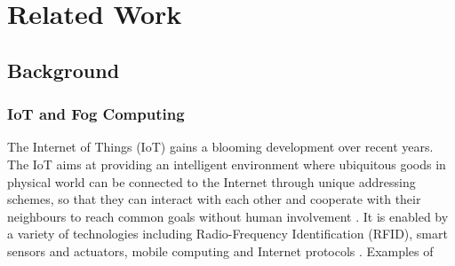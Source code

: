 \chapter{Related Work}\label{ch3}


\section{Background} \label{background}

\subsection{IoT and Fog Computing} 

The Internet of Things (IoT) gains a blooming development over recent years. The IoT aims at providing an intelligent environment where ubiquitous goods in physical world can be connected to the Internet through unique addressing schemes, so that they can interact with each other and cooperate with their neighbours to reach common goals without human involvement \autocite{Atzori20102787}.  It is enabled by a variety of technologies including Radio-Frequency Identification (RFID), smart sensors and actuators, mobile computing and Internet protocols \autocite{7123563}. Examples of 


